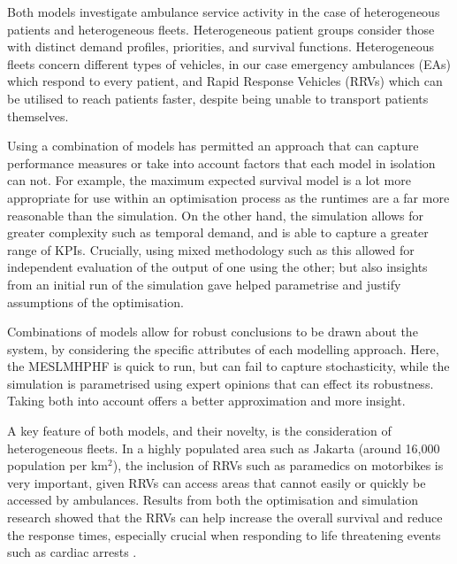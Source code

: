 \documentclass[numbers,webpdf,imaman]{ima-authoring-template}%
\begin{document}
Both models investigate ambulance service activity in the case of heterogeneous
patients and heterogeneous fleets. Heterogeneous patient groups consider those
with distinct demand profiles, priorities, and survival functions. Heterogeneous
fleets concern different types of vehicles, in our case emergency ambulances
(EAs) which respond to every patient, and Rapid Response Vehicles (RRVs) which
can be utilised to reach patients faster, despite being unable to transport
patients themselves.

Using a combination of models has permitted an approach that can capture
performance measures or take into account factors that each model in isolation
can not. For example, the maximum expected survival model is a lot more
appropriate for use within an optimisation process as the runtimes are a far
more reasonable than the simulation. On the other hand, the simulation allows
for greater complexity such as temporal demand, and is able to capture a
greater range of KPIs. Crucially, using mixed methodology such as this allowed
for independent evaluation of the output of one using the other; but also
insights from an initial run of the simulation gave helped parametrise and
justify assumptions of the optimisation. 

Combinations of models allow for robust conclusions to be drawn
about the system, by considering the specific attributes of each modelling
approach. Here, the MESLMHPHF is quick to run, but can fail to capture
stochasticity, while the simulation is parametrised using expert opinions that
can effect its robustness. Taking both into account offers a better
approximation and more insight.

A key feature of both models, and their novelty, is the consideration of
heterogeneous fleets. In a highly populated area such as Jakarta (around
16,000 population per km$^2$), the inclusion of RRVs such as paramedics on
motorbikes is very important, given RRVs can access areas that cannot easily
or quickly be accessed by ambulances. Results from both the optimisation and
simulation research showed that the RRVs can help increase the overall
survival and reduce the response times, especially crucial when responding to
life threatening events such as cardiac arrests \citep{holmen2020shortening}.
\end{document}
